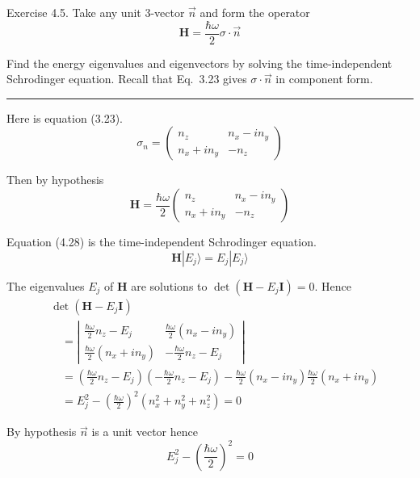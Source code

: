 \documentclass[12pt]{article}
\begin{document}
Exercise 4.5.
Take any unit 3-vector $\vec n$ and form the operator
\begin{equation*}
\mathbf H=\frac{\hbar\omega}{2}\sigma\cdot\vec n
\end{equation*}

Find the energy eigenvalues and eigenvectors by solving the
time-independent Schrodinger equation.
Recall that Eq.~3.23 gives $\sigma\cdot\vec n$ in component form.

\bigskip
\hrule

\bigskip
Here is equation (3.23).
\begin{equation*}
\sigma_n=\begin{pmatrix}
n_z & n_x-in_y
\\
n_x+in_y & -n_z
\end{pmatrix}
\tag{3.23}
\end{equation*}

Then by hypothesis
\begin{equation*}
\mathbf H=\frac{\hbar\omega}{2}
\begin{pmatrix}
n_z & n_x-in_y
\\
n_x+in_y & -n_z
\end{pmatrix}
\end{equation*}

Equation (4.28) is the time-independent Schrodinger equation.
\begin{equation*}
\mathbf H|E_j\rangle=E_j|E_j\rangle
\tag{4.28}
\end{equation*}

The eigenvalues $E_j$ of $\mathbf H$ are solutions to $\det(\mathbf H-E_j\mathbf I)=0$.
Hence
\begin{align*}
&\det(\mathbf H-E_j\mathbf I)
\\
&\quad{}=\left|
\begin{matrix}
\frac{\hbar\omega}{2}n_z-E_j & \frac{\hbar\omega}{2}(n_x-in_y)
\\[1ex]
\frac{\hbar\omega}{2}(n_x+in_y) & -\frac{\hbar\omega}{2}n_z-E_j
\end{matrix}
\right|
\\
&\quad{}=\left(\frac{\hbar\omega}{2}n_z-E_j\right)\left(-\frac{\hbar\omega}{2}n_z-E_j\right)
-\frac{\hbar\omega}{2}(n_x-in_y)\frac{\hbar\omega}{2}(n_x+in_y)
\\
&\quad{}=E_j^2-\left(\frac{\hbar\omega}{2}\right)^2\left(n_x^2+n_y^2+n_z^2\right)=0
\end{align*}

By hypothesis $\vec n$ is a unit vector hence
\begin{equation*}
E_j^2-\left(\frac{\hbar\omega}{2}\right)^2=0
\end{equation*}
\end{document}
